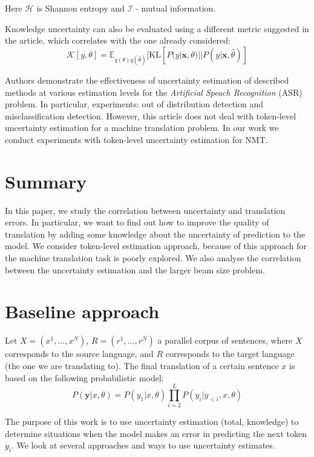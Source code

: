 \documentclass[a4paper,14pt]{extarticle}
\begin{document}
	Here $\mathcal{H}$ is Shannon entropy and $\mathcal{I}$ - mutual information.
	
	Knowledge uncertainty can also be evaluated using a different metric suggested in the article, which correlates with the one already considered:
	\begin{equation}
		\mathcal{K}[y, \theta] = \mathbb{E}_{q(\theta)q(\hat{\theta})}[
			\mathrm{KL}[P(y|\textbf{x}, \theta) || P(y|\textbf{x}, \hat{\theta})
		]
	\end{equation}

	Authors demonstrate the effectiveness of uncertainty estimation of described methods at various estimation levels for the  \textit{Artificial Speach Recognition} (ASR) problem. In particular, experiments: out of distribution detection and misclassification detection. However, this article does not deal with token-level uncertainty estimation for a machine translation problem. In our work we conduct experiments with token-level uncertainty estimation for NMT.
	\section{Summary}
	In this paper, we study the correlation between uncertainty and translation errors. In particular, we want to find out how to improve the quality of translation by adding some knowledge about the uncertainty of prediction to the model. We consider token-level estimation approach, because of this approach for the machine translation task is poorly explored. We also analyse the correlation between the uncertainty estimation and the larger beam size problem.
	

\section{Baseline approach}
	Let $X = (x^1, \dots, x^N)$, $R = (r^1, \dots, r^N)$ a parallel corpus of sentences, where $X$ corresponds to the source language, and $R$ corresponds to the target language (the one we are translating to). The final translation of a certain sentence $x$ is based on the following probabilistic model:
	\begin{equation*}
		P(\textbf{y} | x, \theta) = P(y_1 | x, \theta) \prod_{i=2}^{L} P(y_i | y_{<i}, x, \theta)
	\end{equation*}
	
	The purpose of this work is to use uncertainty estimation (total, knowledge) to determine situations when the model makes an error in predicting the next token $y_i$. We look at several approaches and ways to use uncertainty estimates.
\end{document}
